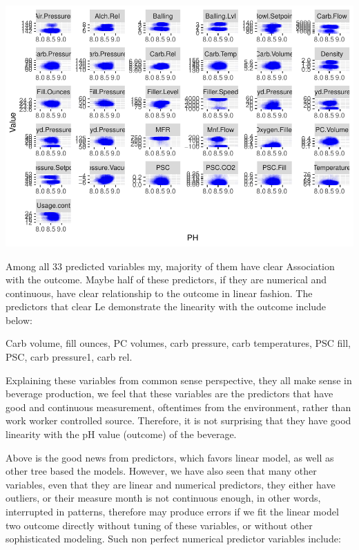 \documentclass[]{article}
\begin{document}
\begin{center}\includegraphics{OmerOzeren_GracieHan_Project_2_files/figure-latex/unnamed-chunk-9-1} \end{center}

Among all 33 predicted variables my, majority of them have clear
Association with the outcome. Maybe half of these predictors, if they
are numerical and continuous, have clear relationship to the outcome in
linear fashion. The predictors that clear Le demonstrate the linearity
with the outcome include below:

Carb volume, fill ounces, PC volumes, carb pressure, carb temperatures,
PSC fill, PSC, carb pressure1, carb rel.

Explaining these variables from common sense perspective, they all make
sense in beverage production, we feel that these variables are the
predictors that have good and continuous measurement, oftentimes from
the environment, rather than work worker controlled source. Therefore,
it is not surprising that they have good linearity with the pH value
(outcome) of the beverage.

Above is the good news from predictors, which favors linear model, as
well as other tree based the models. However, we have also seen that
many other variables, even that they are linear and numerical
predictors, they either have outliers, or their measure month is not
continuous enough, in other words, interrupted in patterns, therefore
may produce errors if we fit the linear model two outcome directly
without tuning of these variables, or without other sophisticated
modeling. Such non perfect numerical predictor variables include:
\end{document}
